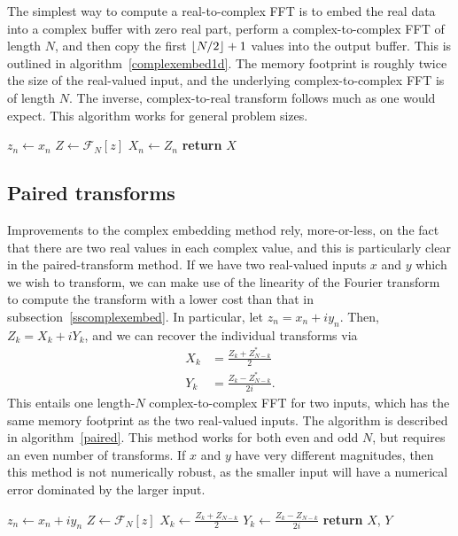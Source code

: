 \documentclass[12pt]{article}
\DeclarePairedDelimiter\floor{\lfloor}{\rfloor}
\newcommand{\Four}{\mathcal{F}}
\begin{document}
The simplest way to compute a real-to-complex FFT is to embed the real
data into a complex buffer with zero real part, perform a
complex-to-complex FFT of length $N$, and then copy the first
$\floor{N/2}+1$ values into the output buffer.  This is outlined in
algorithm~\ref{complexembed1d}.  The memory footprint is roughly twice
the size of the real-valued input, and the underlying
complex-to-complex FFT is of length $N$.  The inverse, complex-to-real
transform follows much as one would expect.  This algorithm works for
general problem sizes.
\begin{algorithm}
  \caption{Complex embedding}\label{complexembed1d}
  \begin{algorithmic}[1]
    \State $z_n \gets x_n$
    \EndFor
    \State $Z \gets \Four_N\left[z\right]$
    \State $X_n \gets Z_n$
    \EndFor
    \State \textbf{return} $X$
  \end{algorithmic}
\end{algorithm}

\subsection{Paired transforms}

Improvements to the complex embedding method rely, more-or-less, on
the fact that there are two real values in each complex value, and
this is particularly clear in the paired-transform method.  If we have
two real-valued inputs $x$ and $y$ which we wish to transform, we can
make use of the linearity of the Fourier transform to compute the
transform with a lower cost than that in
subsection~\ref{sscomplexembed}.  In particular, let $z_n = x_n + i
y_n$.  Then, $Z_k = X_k + i Y_k$, and we can recover the individual
transforms via
\begin{align}
  X_k &= \frac{Z_k + Z_{N-k}^*}{2} \\
  Y_k &= \frac{Z_k - Z_{N-k}^*}{2i}.
\end{align}
This entails one length-$N$ complex-to-complex FFT for two inputs,
which has the same memory footprint as the two real-valued inputs.
The algorithm is described in algorithm~\ref{paired}.  This method
works for both even and odd $N$, but requires an even number of
transforms.  If $x$ and $y$ have very different magnitudes, then this
method is not numerically robust, as the smaller input will have a
numerical error dominated by the larger input.
\begin{algorithm}
  \caption{Paired transforms}\label{paired}
  \begin{algorithmic}[1]
    \State $z_n \gets x_n + i y_n$
    \EndFor
    \State $Z \gets \Four_N\left[z\right]$
    \State $X_k \gets \frac{Z_k + Z_{N-k}}{2}$
    \State $Y_k \gets \frac{Z_k - Z_{N-k}}{2i}$
    \EndFor
    \State \textbf{return} $X$, $Y$
  \end{algorithmic}
\end{algorithm}
\end{document}
